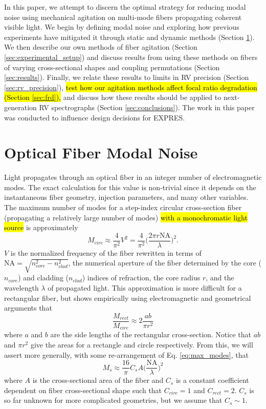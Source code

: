 \documentclass[twocolumn]{emulateapj}
\begin{document}
In this paper, we attempt to discern the optimal strategy for reducing modal noise using mechanical agitation on multi-mode fibers propagating coherent visible light. We begin by defining modal noise and exploring how previous experiments have mitigated it through static and dynamic methods (Section \ref{sec:modal_noise_intro}). We then describe our own methods of fiber agitation (Section \ref{sec:experimental_setup}) and discuss results from using these methods on fibers of varying cross-sectional shapes and coupling permutations (Section \ref{sec:results}). Finally, we relate these results to limits in RV precision (Section \ref{sec:rv_precision}), \hl{test how our agitation methods affect focal ratio degradation (Section {\ref{sec:frd}}),} and discuss how these results should be applied to next-generation RV spectrographs (Section \ref{sec:conclusions}). The work in this paper was conducted to influence design decisions for EXPRES.

\section{Optical Fiber Modal Noise}
\label{sec:modal_noise_intro}

Light propagates through an optical fiber in an integer number of electromagnetic modes. The exact calculation for this value is non-trivial since it depends on the instantaneous fiber geometry, injection parameters, and many other variables. The maximum number of modes for a step-index circular cross-section fiber (propagating a relatively large number of modes) \hl{with a monochromatic light source} is approximately
\begin{equation}
M_{circ} \approx \frac{4}{\pi ^2} V^2 = \frac{4}{\pi ^2} \Bigg( \frac{2 \pi r \mathrm{NA}}{\lambda} \Bigg) ^2.
\label{eq:max_modes}
\end{equation}
$V$ is the normalized frequency of the fiber rewritten in terms of $\mathrm{NA} = \sqrt{n_{core}^2 - n_{clad}^2}$, the numerical aperture of the fiber determined by the core ($n_{core}$) and cladding ($n_{clad}$) indices of refraction, the core radius $r$, and the wavelength $\lambda$ of propagated light. This approximation is more difficult for a rectangular fiber, but \citet{Nikitin2011} shows empirically using electromagnetic and geometrical arguments that
\begin{equation}
\frac{M_{rect}}{M_{circ}} \approx 2 \frac{ab}{\pi r^2}
\label{eq:prop_modes}
\end{equation}
where $a$ and $b$ are the side lengths of the rectangular cross-section. Notice that $ab$ and $\pi r^2$ give the areas for a rectangle and circle respectively. From this, we will assert more generally, with some re-arrangement of Eq. \ref{eq:max_modes}, that
\begin{equation}
M_{s} \approx \frac{16}{\pi} C_{s} A \Bigg( \frac{\mathrm{NA}}{\lambda} \Bigg) ^2
\label{eq:mode_area}
\end{equation}
where $A$ is the cross-sectional area of the fiber and $C_{s}$ is a constant coefficient dependent on fiber cross-sectional shape such that $C_{circ} = 1$ and $C_{rect} = 2$. $C_{s}$ is so far unknown for more complicated geometries, but we assume that $C_{s} \sim 1$.
\end{document}
